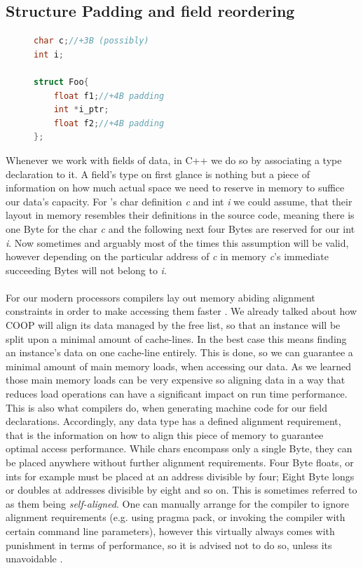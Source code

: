 \subsection{Structure Padding and field reordering}\label{structure_padding_and_field_reordering}
\begin{figure}
\vspace{-1cm}
\begin{lstlisting}[language=C++,numbers=none,name={Example field declarations to elaborate on structure padding},label={padding}]
char c;//+3B (possibly)
int i;

struct Foo{
	float f1;//+4B padding
	int *i_ptr;
	float f2;//+4B padding
};
\end{lstlisting}
\end{figure}
Whenever we work with fields of data, in C++ we do so by associating a type declaration to it. A field's type on first glance is nothing but a piece of information on how much actual space we need to reserve in memory to suffice our data's capacity. For 's char definition \textit{c} and int \textit{i} we could assume, that their layout in memory resembles their definitions in the source code, meaning there is one Byte for the char \textit{c} and the following next four Bytes are reserved for our int \textit{i}. Now sometimes and arguably most of the times this assumption will be valid, however depending on the particular address of \textit{c} in memory \textit{c}'s immediate succeeding Bytes will not belong to \textit{i}.\\\\
For our modern processors compilers lay out memory abiding alignment constraints in order to make accessing them faster . We already talked about how COOP will align its data managed by the free list, so that an instance will be split upon a minimal amount of cache-lines. In the best case this means finding an instance's data on one cache-line entirely. This is done, so we can guarantee a minimal amount of main memory loads, when accessing our data. As we learned those main memory loads can be very expensive so aligning data in a way that reduces load operations can have a significant impact on run time performance.\\
This is also what compilers do, when generating machine code for our field declarations. Accordingly, any data type has a defined alignment requirement, that is the information on how to align this piece of memory to guarantee optimal access performance. While chars encompass only a single Byte, they can be placed anywhere without further alignment requirements. Four Byte floats, or ints for example must be placed at an address divisible by four; Eight Byte longs or doubles at addresses divisible by eight and so on. This is sometimes referred to as them being \textit{self-aligned}. One can manually arrange for the compiler to ignore alignment requirements (e.g. using pragma pack, or invoking the compiler with certain command line parameters), however this virtually always comes with punishment in terms of performance, so it is advised not to do so, unless its unavoidable .\\
